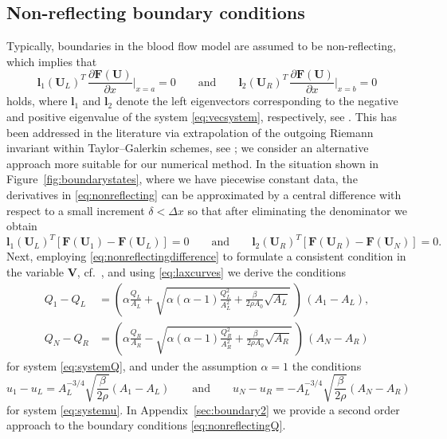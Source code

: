 \documentclass[a4paper,11pt]{article}
\begin{document}
\subsection{Non-reflecting boundary conditions}
Typically, boundaries in the blood flow model are assumed to be non-reflecting, which implies that 
\begin{equation}\label{eq:nonreflecting}
  \mathbf l_1(\mathbf U_L)^T \, \frac{ \partial \mathbf F(\mathbf U)}{\partial x} \bigg \rvert_{x=a} = 0 \qquad \text{and} \qquad
  \mathbf l_2(\mathbf U_R)^T \, \frac{ \partial \mathbf F(\mathbf U)}{\partial x} \bigg \rvert_{x=b} = 0
\end{equation}
holds, where $\mathbf l_1$ and  $\mathbf l_2$ denote the left eigenvectors corresponding to the negative and positive eigenvalue of the system \eqref{eq:vecsystem}, respectively, see \cite{thompson1987time}. This has been addressed in the literature via extrapolation of the outgoing Riemann invariant within Taylor--Galerkin schemes, see \cite{quarteroni2004mathem}; we consider an alternative approach more suitable for our numerical method. In the situation shown in Figure~\ref{fig:boundarystates}, where we have piecewise constant data, the derivatives in \eqref{eq:nonreflecting} can be approximated by a central difference with respect to a small increment $\delta < \Delta x$ so that after eliminating the denominator we obtain
\begin{equation}\label{eq:nonreflectingdifference}
  \mathbf l_1(\mathbf U_L)^T [\mathbf F(\mathbf U_1) - \mathbf F(\mathbf U_L)]  = 0 \qquad \text{and} \qquad
  \mathbf l_2(\mathbf U_R)^T [\mathbf F(\mathbf U_R) - \mathbf F(\mathbf U_N)] = 0.
\end{equation}
Next, employing \eqref{eq:nonreflectingdifference} to formulate a consistent condition in the variable $\mathbf V$, cf.~\cite{herty2023centrschemtwo}, and using \eqref{eq:laxcurves} we derive the conditions
\begin{equation}\label{eq:nonreflectingQ}
  \begin{aligned}
    Q_1 - Q_L &= \left(\alpha \frac{Q_L}{A_L}+ \sqrt{\alpha (\alpha -1) \frac{Q_L^2}{A_L^2} + \frac{\beta}{2 \rho A_0} \sqrt{A_L}}~\right) \, (A_1 - A_L), \\
    Q_N - Q_R &= \left(\alpha \frac{Q_R}{A_R}- \sqrt{\alpha (\alpha -1) \frac{Q_R^2}{A_R^2} + \frac{\beta}{2 \rho A_0} \sqrt{A_R}} ~\right)\, (A_N - A_R)
  \end{aligned}
\end{equation}
for system \eqref{eq:systemQ}, and under the assumption $\alpha=1$ the conditions
\begin{equation}\label{eq:nonreflectingu}
  u_1 - u_L =  A_L^{-3/4} \sqrt{\frac{\beta}{2\rho}} (A_1 - A_L) 
  \qquad \text{and} \qquad
  u_N - u_R =  -A_L^{-3/4} \sqrt{\frac{\beta}{2\rho}} (A_N - A_R)  
\end{equation}
for system \eqref{eq:systemu}. In Appendix~\ref{sec:boundary2} we provide a second order approach to the boundary conditions \eqref{eq:nonreflectingQ}. 
\end{document}
